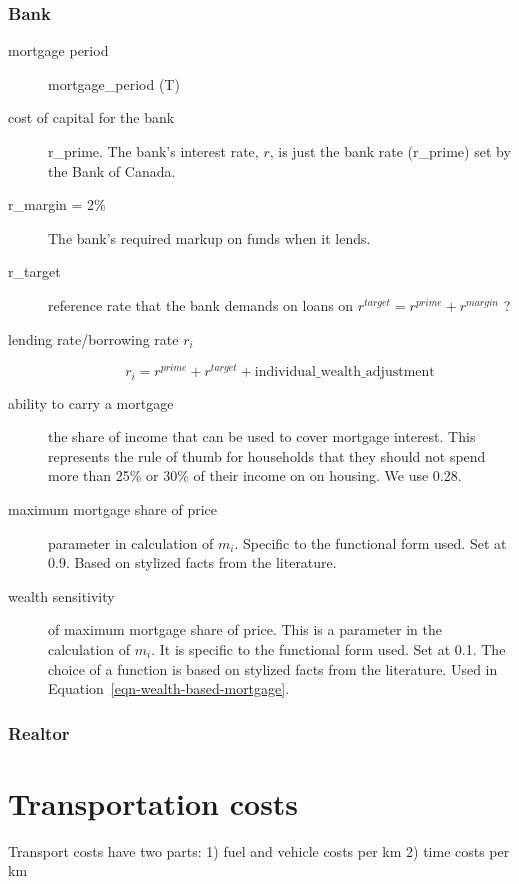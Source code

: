 \subsubsection{Bank} %
\begin{description}
\item [mortgage period]  mortgage\_period (T)
\item [cost of capital for the bank] r\_prime. The bank's interest rate, $r$, is just the bank rate (r\_prime) set by the Bank of Canada.  

\item [r\_margin = 2\%] The bank's required markup on funds when it lends.  

\item [r\_target] reference rate that the bank demands on loans on 
$ r^{target}= r^{prime} +r^{margin}$ ? 

\item[lending rate/borrowing rate $r_i$]  
\[r_i=r^{prime} + r^{target} + \mathrm{individual\_wealth\_adjustment}\]

\item [{ability to carry a mortgage}] the share of income that can be used to cover mortgage interest. This represents the rule of thumb for households that they should not spend more than 25\% or 30\% of their income on on housing. We use 0.28.

\item [\gls{maximum mortgage share} of price] parameter in calculation of $m_i$. Specific to the functional form used. Set at 0.9. Based on stylized facts from the literature.  %
\item[wealth sensitivity] of maximum mortgage share of price. This is a parameter in the calculation of $m_i$. It is specific to the functional form used. Set at 0.1. The choice of a function is based on stylized facts from the literature.  %
Used in Equation~\ref{eqn-wealth-based-mortgage}.
\end{description}

\subsubsection{Realtor}

\section{Transportation costs}
Transport costs have two parts:
1) fuel and vehicle costs per km
2) time costs per km


